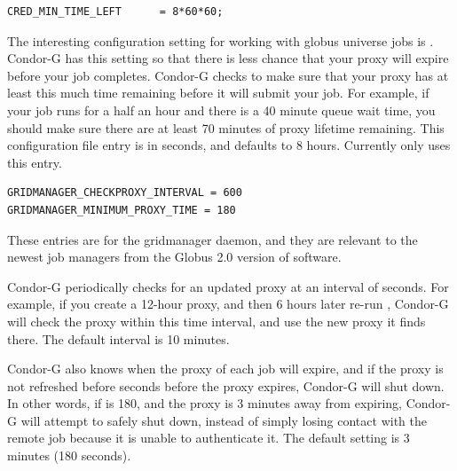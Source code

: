 \begin{verbatim}
CRED_MIN_TIME_LEFT      = 8*60*60;
\end{verbatim} 
The interesting configuration setting for working with globus universe
jobs is
.
Condor-G has this setting so that there is less chance that your
proxy will expire before your job completes.
Condor-G checks
to make sure that your proxy has at least this
much time remaining
before it will submit your job.
For example, if your job runs for a
half an hour and there is a 40 minute queue wait time,
you should make sure there are
at least 70 minutes of proxy lifetime remaining.
This configuration file entry is in seconds,
and defaults to 8 hours.
Currently only  uses this entry.

\begin{verbatim}
GRIDMANAGER_CHECKPROXY_INTERVAL = 600
GRIDMANAGER_MINIMUM_PROXY_TIME = 180
\end{verbatim} 

These entries are for the gridmanager daemon, and they are relevant to
the newest job managers from the Globus 2.0 version of software.

Condor-G periodically checks for an updated proxy at
an interval of
seconds.
For example, if you create a 12-hour proxy, and then
6 hours later re-run ,
Condor-G will check the proxy within
this time interval, and use the new proxy it finds there.
The default interval is 10 minutes.

Condor-G also knows when the proxy of each job will expire,
and if the proxy is not refreshed before
seconds before the proxy expires,
Condor-G will shut down.
In other words, if
is 180, and the proxy is 3 minutes away from
expiring, Condor-G will attempt to safely shut down,
instead of simply losing
contact with the remote job because it is unable to authenticate it.
The default setting is 3 minutes (180 seconds).


